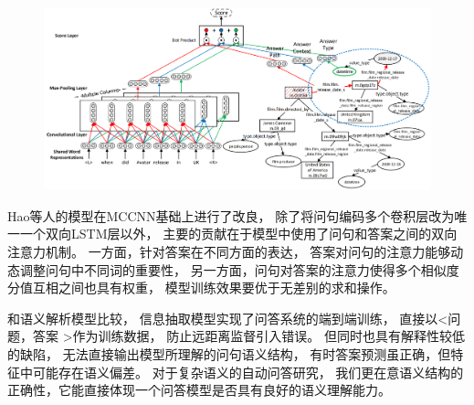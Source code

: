 \begin{figure}[ht]
\centering
\includegraphics[width=0.95\columnwidth]{figure/rw/qa-mccnn.png}
\label{fig:rw-ir:b}
\end{figure}

Hao等人\cite{hao2017end}的模型在MCCNN基础上进行了改良，
除了将问句编码多个卷积层改为唯一一个双向LSTM层以外，
主要的贡献在于模型中使用了问句和答案之间的双向注意力机制。
一方面，针对答案在不同方面的表达，
答案对问句的注意力能够动态调整问句中不同词的重要性，
另一方面，问句对答案的注意力使得多个相似度分值互相之间也具有权重，
模型训练效果要优于无差别的求和操作。

%

和语义解析模型比较，
信息抽取模型实现了问答系统的端到端训练，
直接以\textless 问题，答案 \textgreater 作为训练数据，
防止远距离监督引入错误。
但同时也具有解释性较低的缺陷，
无法直接输出模型所理解的问句语义结构，
有时答案预测虽正确，但特征中可能存在语义偏差。
对于复杂语义的自动问答研究，
我们更在意语义结构的正确性，它能直接体现一个问答模型是否具有良好的语义理解能力。


